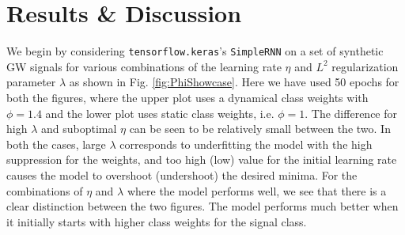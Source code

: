 \documentclass[%
reprint,
amsmath,amssymb,
aps,
]{revtex4-2}
\begin{document}
\section{Results \& Discussion}
We begin by considering \texttt{tensorflow.keras}'s \texttt{SimpleRNN} on a set of synthetic GW signals for various combinations of the learning rate $\eta$ and $L^2$ regularization parameter $\lambda$ as shown in Fig. \ref{fig:PhiShowcase}. Here we have used 50 epochs for both the figures, where the upper plot uses a dynamical class weights with $\phi=1.4$ and the lower plot uses static class weights, i.e. $\phi=1$. The difference for high $\lambda$ and suboptimal $\eta$ can be seen to be relatively small between the two. In both the cases, large $\lambda$ corresponds to underfitting the model with the high suppression for the weights, and too high (low) value for the initial learning rate causes the model to overshoot (undershoot) the desired minima. For the combinations of $\eta$ and $\lambda$ where the model performs well, we see that there is a clear distinction between the two figures. The model performs much better when it initially starts with higher class weights for the signal class.
\end{document}
